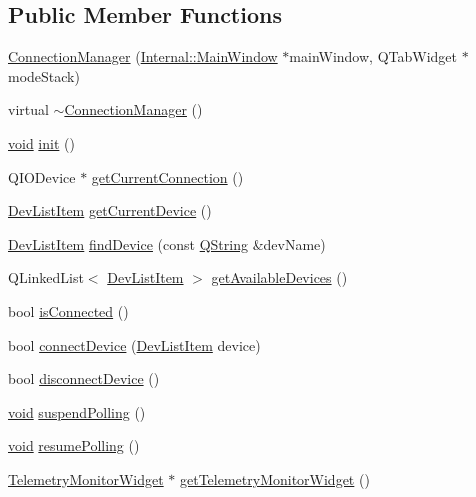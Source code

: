 \subsection*{Public Member Functions}
\begin{DoxyCompactItemize}
\item 
\hyperlink{group___core_plugin_ga45c9149d071d17532d5887d3a64f9cd1}{Connection\-Manager} (\hyperlink{class_core_1_1_internal_1_1_main_window}{Internal\-::\-Main\-Window} $\ast$main\-Window, Q\-Tab\-Widget $\ast$mode\-Stack)
\item 
virtual \hyperlink{group___core_plugin_ga44b4646ef623b71c4a789f3f4213ccbf}{$\sim$\-Connection\-Manager} ()
\item 
\hyperlink{group___u_a_v_objects_plugin_ga444cf2ff3f0ecbe028adce838d373f5c}{void} \hyperlink{group___core_plugin_gab896af0a853749c60a450bf14ce00400}{init} ()
\item 
Q\-I\-O\-Device $\ast$ \hyperlink{group___core_plugin_ga85cbf1f53f7086545a446ec224a3143f}{get\-Current\-Connection} ()
\item 
\hyperlink{class_core_1_1_dev_list_item}{Dev\-List\-Item} \hyperlink{group___core_plugin_ga93568acf4b301c44a1d9bf243066f3ff}{get\-Current\-Device} ()
\item 
\hyperlink{class_core_1_1_dev_list_item}{Dev\-List\-Item} \hyperlink{group___core_plugin_ga7b6178bc28a6457e18586c215a53256b}{find\-Device} (const \hyperlink{group___u_a_v_objects_plugin_gab9d252f49c333c94a72f97ce3105a32d}{Q\-String} \&dev\-Name)
\item 
Q\-Linked\-List$<$ \hyperlink{class_core_1_1_dev_list_item}{Dev\-List\-Item} $>$ \hyperlink{group___core_plugin_ga7527fd84dd3f5fc73130480ab1e45c86}{get\-Available\-Devices} ()
\item 
bool \hyperlink{group___core_plugin_gaa260057af9b250ed953ba1dbe455d71b}{is\-Connected} ()
\item 
bool \hyperlink{group___core_plugin_gae4e29b41f3deb1349c8f21bfe6f6e597}{connect\-Device} (\hyperlink{class_core_1_1_dev_list_item}{Dev\-List\-Item} device)
\item 
bool \hyperlink{group___core_plugin_ga679b06064b497205af5453783acff419}{disconnect\-Device} ()
\item 
\hyperlink{group___u_a_v_objects_plugin_ga444cf2ff3f0ecbe028adce838d373f5c}{void} \hyperlink{group___core_plugin_gad4e7e06b9cc1c4720a0bb9202c5dca19}{suspend\-Polling} ()
\item 
\hyperlink{group___u_a_v_objects_plugin_ga444cf2ff3f0ecbe028adce838d373f5c}{void} \hyperlink{group___core_plugin_gaffc78d62ba1226c3d690158e30db4dee}{resume\-Polling} ()
\item 
\hyperlink{class_telemetry_monitor_widget}{Telemetry\-Monitor\-Widget} $\ast$ \hyperlink{group___core_plugin_ga161596a57af98c968d8adc57fef40a4b}{get\-Telemetry\-Monitor\-Widget} ()
\end{DoxyCompactItemize}
